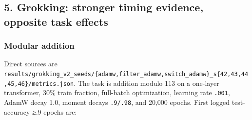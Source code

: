 \documentclass[
  british,
  10pt,
  a4paper,
]{article}
\begin{document}
\subsection{5. Grokking: stronger timing evidence, opposite task
effects}\label{classical-evidence--grokking-stronger-timing-evidence-opposite-task-effects}

\subsubsection{Modular
addition}\label{classical-evidence--modular-addition}

Direct sources are
\texttt{results/\allowbreak{}grokking\_\allowbreak{}v2\_\allowbreak{}seeds/\allowbreak{}\{\allowbreak{}adamw,\allowbreak{}filter\_\allowbreak{}adamw,\allowbreak{}switch\_\allowbreak{}adamw\}\allowbreak{}\_\allowbreak{}s\{\allowbreak{}42,\allowbreak{}43,\allowbreak{}44,\allowbreak{}45,\allowbreak{}46\}\allowbreak{}/\allowbreak{}metrics.\allowbreak{}json}.
The task is addition modulo 113 on a one-layer transformer,\allowbreak{}
30\% train fraction, full-batch optimization\allowbreak{},\allowbreak{}
learning rate \texttt{.001}, AdamW decay 1.0, moment decays
\texttt{.9/.98}, and 20,000 epochs. First logged
test-\allowbreak{}accuracy ≥.9 epochs are:
\end{document}
